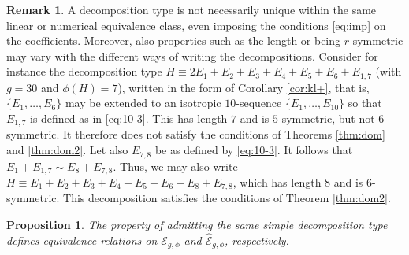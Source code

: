 \documentclass[11pt]{amsart}
\newtheorem{proposition}[thm]{Proposition}
\theoremstyle{definition}
\newtheorem{remark}[thm]{Remark}
\def\E{{\mathcal E}}
\begin{document}
\begin{remark} \label{rem:notunique}
  A decomposition type is not necessarily unique within the same linear or numerical equivalence class,   even imposing the conditions \eqref{eq:imp}  on the coefficients. Moreover, also  properties  such as the length or being
$r$-symmetric may  vary with the different ways of writing the
decompositions.  Consider for instance the decomposition type $H
\equiv 2E_1+E_2+E_3+E_4+E_5+E_6+E_{1,7}$ (with $g=30$ and
$\phi(H)=7$),  written in the form of Corollary \ref{cor:kl+}, that is,  $\{E_1,\ldots,E_6\}$  may be extended  to an isotropic $10$-sequence   $\{E_1,\ldots,E_{10}\}$  so that $E_{1,7}$ is defined as in 
\eqref{eq:10-3}. This has length $7$ and is $5$-symmetric, but not
$6$-symmetric.  It therefore does not satisfy the conditions of Theorems \ref{thm:dom} and \ref{thm:dom2}. 
 Let also $E_{7,8}$ be as defined by
\eqref{eq:10-3}. It follows that $E_1+E_{1,7} \sim E_8+E_{7,8}$. Thus,
we may also write $H \equiv E_1+E_2+E_3+E_4+E_5+E_6+E_8+E_{7,8}$,
which has length $8$ and is $6$-symmetric.  This decomposition satisfies the conditions of Theorem \ref{thm:dom2}. 
\end{remark}



\begin{proposition} \label{prop:trans}
The property of admitting the same simple decomposition type defines equivalence relations on $\E_{g,\phi}$ and $\widehat{\E}_{g,\phi}$, respectively.
\end{proposition}
\end{document}
